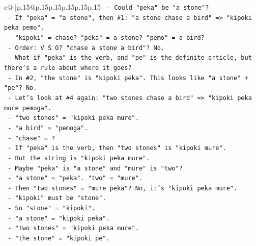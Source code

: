 \documentclass{article}
\begin{document}
{\begin{supertabular}{c@{$\;$}|p{.15\linewidth}@{}p{.15\linewidth}p{.15\linewidth}p{.15\linewidth}p{.15\linewidth}p{.15\linewidth}}
{{{\texttt{                              {-} Could "peka" be "a stone"?} \\
\texttt{                              {-} If "peka" = "a stone", then \#1: "a stone chase a bird" => "kipoki peka pemo".} \\
\texttt{                                {-} "kipoki" = chase? "peka" = a stone? "pemo" = a bird?} \\
\texttt{                                {-} Order: V S O? "chase a stone a bird"? No.} \\
\texttt{                              {-} What if "peka" is the verb, and "pe" is the definite article, but there's a rule about where it goes?} \\
\texttt{                              {-} In \#2, "the stone" is "kipoki peka". This looks like "a stone" + "pe"? No.} \\
\texttt{                              {-} Let's look at \#4 again: "two stones chase a bird" => "kipoki peka mure pemoga".} \\
\texttt{                                {-} "two stones" = "kipoki peka mure".} \\
\texttt{                                {-} "a bird" = "pemoga".} \\
\texttt{                                {-} "chase" = ?} \\
\texttt{                                {-} If "peka" is the verb, then "two stones" is "kipoki mure".} \\
\texttt{                                {-} But the string is "kipoki peka mure".} \\
\texttt{                                {-} Maybe "peka" is "a stone" and "mure" is "two"?} \\
\texttt{                                {-} "a stone" = "peka". "two" = "mure".} \\
\texttt{                                {-} Then "two stones" = "mure peka"? No, it's "kipoki peka mure".} \\
\texttt{                                {-} "kipoki" must be "stone".} \\
\texttt{                                {-} So "stone" = "kipoki".} \\
\texttt{                                {-} "a stone" = "kipoki peka".} \\
\texttt{                                {-} "two stones" = "kipoki peka mure".} \\
\texttt{                                {-} "the stone" = "kipoki pe".} \\
}}}
\end{supertabular}}
\end{document}
